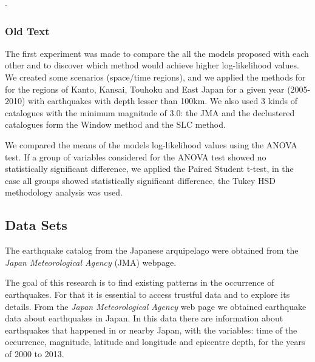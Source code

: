 - 

\subsubsection*{Old Text}

The first experiment was made to compare the all the models proposed
with each other and to discover which method would achieve higher
log-likelihood values. We created some scenarios (space/time regions),
and we applied the methods for for the regions of Kanto, Kansai,
Touhoku and East Japan for a given year (2005-2010) with earthquakes
with depth lesser than 100km. We also used 3 kinds of catalogues with
the minimum magnitude of 3.0: the JMA and the declustered catalogues
form the Window method and the SLC method.

We compared the means of the models log-likelihood values using the
ANOVA test. If a group of variables considered for the ANOVA test
showed no statistically significant difference, we applied the Paired
Student t-test, in the case all groups showed statistically
significant difference, the Tukey HSD methodology analysis was used.



\subsection{Data Sets}



The earthquake catalog from the Japanese arquipelago were obtained
from the \emph{Japan Meteorological Agency} (JMA) webpage.





The goal of this research is to find existing patterns in the
occurrence of earthquakes. For that it is essential to access trustful
data and to explore its details. From the {\it Japan Meteorological
  Agency} web page we obtained earthquake data about earthquakes in
Japan. In this data there are information about earthquakes that
happened in or nearby Japan, with the variables: time of the
occurrence, magnitude, latitude and longitude and epicentre depth, for
the years of 2000 to 2013.

